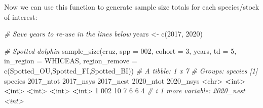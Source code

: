 \documentclass[
]{book}
\newenvironment{Shaded}{\begin{snugshade}}{\end{snugshade}}
\newcommand{\AttributeTok}[1]{\textcolor[rgb]{0.77,0.63,0.00}{#1}}
\newcommand{\CommentTok}[1]{\textcolor[rgb]{0.56,0.35,0.01}{\textit{#1}}}
\newcommand{\DecValTok}[1]{\textcolor[rgb]{0.00,0.00,0.81}{#1}}
\newcommand{\ErrorTok}[1]{\textcolor[rgb]{0.64,0.00,0.00}{\textbf{#1}}}
\newcommand{\FunctionTok}[1]{\textcolor[rgb]{0.00,0.00,0.00}{#1}}
\newcommand{\NormalTok}[1]{#1}
\newcommand{\OtherTok}[1]{\textcolor[rgb]{0.56,0.35,0.01}{#1}}
\newcommand{\SpecialCharTok}[1]{\textcolor[rgb]{0.00,0.00,0.00}{#1}}
\newcommand{\StringTok}[1]{\textcolor[rgb]{0.31,0.60,0.02}{#1}}
\begin{document}
Now we can use this function to generate sample size totals for each species/stock of interest:

\begin{Shaded}
\begin{Highlighting}[]
\CommentTok{\# Save years to re{-}use in the lines below}
\NormalTok{years }\OtherTok{\textless{}{-}} \FunctionTok{c}\NormalTok{(}\DecValTok{2017}\NormalTok{, }\DecValTok{2020}\NormalTok{)}

\CommentTok{\# Spotted dolphin}
\FunctionTok{sample\_size}\NormalTok{(cruz, }
            \AttributeTok{spp =} \StringTok{\textquotesingle{}002\textquotesingle{}}\NormalTok{, }
            \AttributeTok{cohort =} \DecValTok{3}\NormalTok{, }
\NormalTok{            years, }
            \AttributeTok{td =} \DecValTok{5}\NormalTok{, }
            \AttributeTok{in\_region =} \StringTok{\textquotesingle{}WHICEAS\textquotesingle{}}\NormalTok{,}
            \AttributeTok{region\_remove =} \FunctionTok{c}\NormalTok{(}\StringTok{\textquotesingle{}Spotted\_OU\textquotesingle{}}\NormalTok{,}\StringTok{\textquotesingle{}Spotted\_FI\textquotesingle{}}\NormalTok{,}\StringTok{\textquotesingle{}Spotted\_BI\textquotesingle{}}\NormalTok{))}
\CommentTok{\# A tibble: 1 x 7}
\CommentTok{\# Groups:   species [1]}
\NormalTok{  species }\StringTok{\textasciigrave{}}\AttributeTok{2017\_ntot}\StringTok{\textasciigrave{}} \StringTok{\textasciigrave{}}\AttributeTok{2017\_nsys}\StringTok{\textasciigrave{}} \StringTok{\textasciigrave{}}\AttributeTok{2017\_nest}\StringTok{\textasciigrave{}} \StringTok{\textasciigrave{}}\AttributeTok{2020\_ntot}\StringTok{\textasciigrave{}} \StringTok{\textasciigrave{}}\AttributeTok{2020\_nsys}\StringTok{\textasciigrave{}}
  \SpecialCharTok{\textless{}}\NormalTok{chr}\SpecialCharTok{\textgreater{}}         \ErrorTok{\textless{}}\NormalTok{int}\SpecialCharTok{\textgreater{}}       \ErrorTok{\textless{}}\NormalTok{int}\SpecialCharTok{\textgreater{}}       \ErrorTok{\textless{}}\NormalTok{int}\SpecialCharTok{\textgreater{}}       \ErrorTok{\textless{}}\NormalTok{int}\SpecialCharTok{\textgreater{}}       \ErrorTok{\textless{}}\NormalTok{int}\SpecialCharTok{\textgreater{}}
\DecValTok{1} \DecValTok{002}              \DecValTok{10}           \DecValTok{7}           \DecValTok{6}           \DecValTok{6}           \DecValTok{4}
\CommentTok{\# i 1 more variable: \textasciigrave{}2020\_nest\textasciigrave{} \textless{}int\textgreater{}}


\end{Highlighting}
\end{Shaded}
\end{document}
